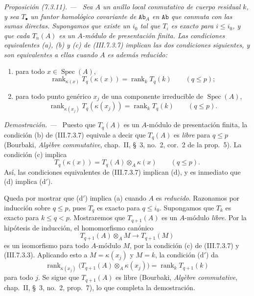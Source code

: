\documentclass[10pt,oneside]{book}
\newcommand{\cat}[1]{\mathtt{#1}}
\newcommand{\kres}{\kappa}
\newcommand{\Spec}{\operatorname{Spec}}
\newcommand{\sref}[2][]{\textup{(#2)}}
\newenvironment{proposition}[1][]{\par\medskip\noindent\itshape Proposición (#1). ---\ }{\par}
\newenvironment{proof}{\par\medskip\noindent\textit{Demostración. ---\ }}{\par}
\begin{document}
\begin{proposition}[7.3.11]
\label{III.7.3.11}
Sea $A$ un anillo local conmutativo de cuerpo residual $k$, y sea
$T_\bullet$ un funtor homológico covariante de $\cat{Ab}_A$ en
$\cat{Ab}$ que conmuta con las sumas directas. Supongamos que
existe un $i_0$ tal que $T_i$ es exacto para $i\leq i_0$, y que cada
$T_n(A)$ es un $A$-módulo de presentación finita. Las condiciones
equivalentes (a), (b) y (c) de \sref{III.7.3.7} implican las dos
condiciones siguientes, y son equivalentes a ellas cuando $A$ es
además reducido:
\begin{enumerate}
  \item[(d)] para todo $x\in\Spec(A)$,
    \[
      \operatorname{rank}_{\kres(x)}
      T_q(\kres(x))
      =
      \operatorname{rank}_k T_q(k)
      \qquad(q\leq p);
    \]
  \item[($\mathrm{d}'$)] para todo punto genérico $x_j$ de una
    componente irreducible de $\Spec(A)$,
    \[
      \operatorname{rank}_{\kres(x_j)}
      T_q(\kres(x_j))
      =
      \operatorname{rank}_k T_q(k)
      \qquad(q\leq p).
    \]
\end{enumerate}
\end{proposition}

\begin{proof}
Puesto que $T_q(A)$ es un $A$-módulo de presentación finita, la
condición (b) de \sref{III.7.3.7} equivale a decir que $T_q(A)$ es
\emph{libre} para $q\leq p$ (Bourbaki, \emph{Alg\`ebre commutative},
chap.~II, \S~3, no.~2, cor.~2 de la prop.~5). La condición (c)
implica
\[
  T_q(\kres(x))
  =
  T_q(A)\otimes_A\kres(x)
  \qquad(q\leq p).
\]
Así, las condiciones equivalentes de \sref{III.7.3.7} implican (d),
y es inmediato que (d) implica ($\mathrm{d}'$).

Queda por mostrar que ($\mathrm{d}'$) implica (a) cuando $A$ es
\emph{reducido}. Razonamos por inducción sobre $q\leq p$, pues $T_q$ es
exacto para $q\leq i_0$. Supongamos que $T_k$ es exacto para
$k\leq q<p$. Mostraremos que $T_{q+1}(A)$ es un $A$-módulo \emph{libre}.
Por la hipótesis de inducción, el homomorfismo canónico
\[
  T_{q+1}(A)\otimes_A M
  \longrightarrow
  T_{q+1}(M)
\]
es un isomorfismo para todo $A$-módulo $M$, por la condición (c) de
\sref{III.7.3.7} y \sref{III.7.3.3}. Aplicando esto a
$M=\kres(x_j)$ y $M=k$, la condición ($\mathrm{d}'$) da
\[
  \operatorname{rank}_{\kres(x_j)}
  \bigl(T_{q+1}(A)\otimes_A\kres(x_j)\bigr)
  =
  \operatorname{rank}_k T_{q+1}(k)
\]
para todo $j$. Se sigue que $T_{q+1}(A)$ es libre (Bourbaki,
\emph{Alg\`ebre commutative}, chap.~II, \S~3, no.~2, prop.~7), lo
que completa la demostración.
\end{proof}
\end{document}
